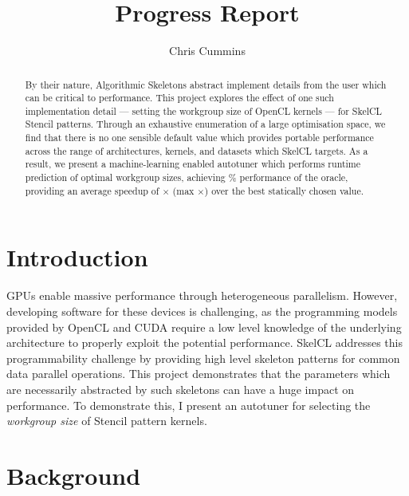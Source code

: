
\title{Progress Report}

\author{Chris Cummins}





\maketitle

\begin{abstract}
  \noindent
  By their nature, Algorithmic Skeletons abstract implement details
  from the user which can be critical to performance. This project
  explores the effect of one such implementation detail --- setting
  the workgroup size of OpenCL kernels --- for SkelCL Stencil
  patterns. Through an exhaustive enumeration of a large optimisation
  space, we find that there is no one sensible default value which
  provides portable performance across the range of architectures,
  kernels, and datasets which SkelCL targets. As a result, we present
  a machine-learning enabled autotuner which performs runtime
  prediction of optimal workgroup sizes, achieving \%
  performance of the oracle, providing an average speedup of
  $\times$ (max $\times$) over the best statically
  chosen value.
\end{abstract}

\section{Introduction}
GPUs enable massive performance through heterogeneous
parallelism. However, developing software for these devices is
challenging, as the programming models provided by OpenCL and CUDA
require a low level knowledge of the underlying architecture to
properly exploit the potential performance. SkelCL addresses this
programmability challenge by providing high level skeleton patterns
for common data parallel operations. This project demonstrates that
the parameters which are necessarily abstracted by such skeletons can
have a huge impact on performance. To demonstrate this, I present an
autotuner for selecting the \emph{workgroup size} of Stencil pattern
kernels.

\section{Background}

